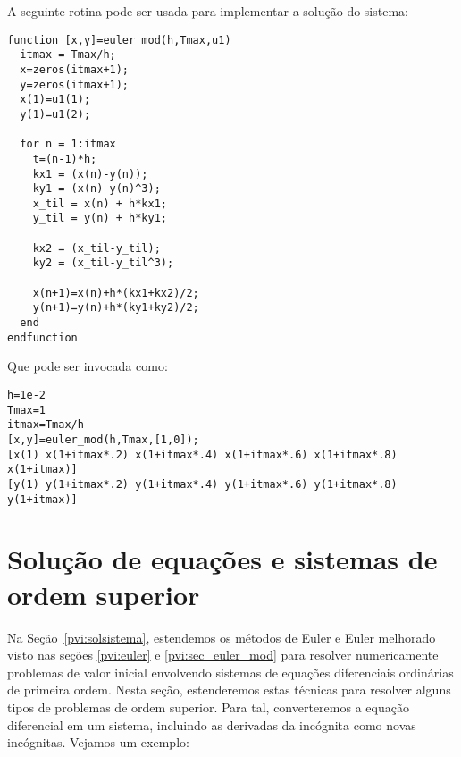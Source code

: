 \begin{resol}
\fi


\ifisscilab
A seguinte rotina pode ser usada para implementar a solução do sistema:
\begin{verbatim}
function [x,y]=euler_mod(h,Tmax,u1)
  itmax = Tmax/h;
  x=zeros(itmax+1);
  y=zeros(itmax+1);
  x(1)=u1(1);
  y(1)=u1(2);
  
  for n = 1:itmax
    t=(n-1)*h;
    kx1 = (x(n)-y(n));
    ky1 = (x(n)-y(n)^3);
    x_til = x(n) + h*kx1;
    y_til = y(n) + h*ky1;
    
    kx2 = (x_til-y_til);
    ky2 = (x_til-y_til^3);

    x(n+1)=x(n)+h*(kx1+kx2)/2;
    y(n+1)=y(n)+h*(ky1+ky2)/2;
  end
endfunction 
\end{verbatim}
Que pode ser invocada como:
\begin{verbatim}
h=1e-2
Tmax=1
itmax=Tmax/h
[x,y]=euler_mod(h,Tmax,[1,0]);
[x(1) x(1+itmax*.2) x(1+itmax*.4) x(1+itmax*.6) x(1+itmax*.8) x(1+itmax)]
[y(1) y(1+itmax*.2) y(1+itmax*.4) y(1+itmax*.6) y(1+itmax*.8) y(1+itmax)]
 \end{verbatim}
\fi
\end{resol}


\section{Solução de equações e sistemas de ordem superior}

Na Seção~\ref{pvi:solsistema}, estendemos os métodos de Euler e Euler melhorado visto nas seções \ref{pvi:euler} e \ref{pvi:sec_euler_mod} para resolver numericamente problemas de valor inicial envolvendo sistemas de equações diferenciais ordinárias de primeira ordem. Nesta seção, estenderemos estas técnicas para resolver alguns tipos de problemas de ordem superior. Para tal, converteremos a equação diferencial em um sistema, incluindo as derivadas da incógnita como novas incógnitas. Vejamos um exemplo:

